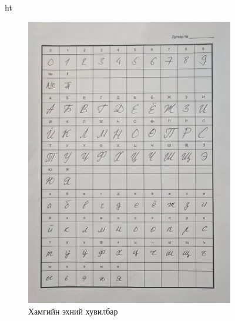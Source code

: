 \begin{figure}{ht}
	\begin{subfigure}{0.5\textwidth}
		\includegraphics[width=0.9\linewidth]{images/sheet_1}
		\caption{Хамгийн эхний хувилбар}
		\label{fig:sheet_1}
	\end{subfigure}
	\begin{subfigure}{0.52\textwidth}

\end{subfigure}
\end{figure}
